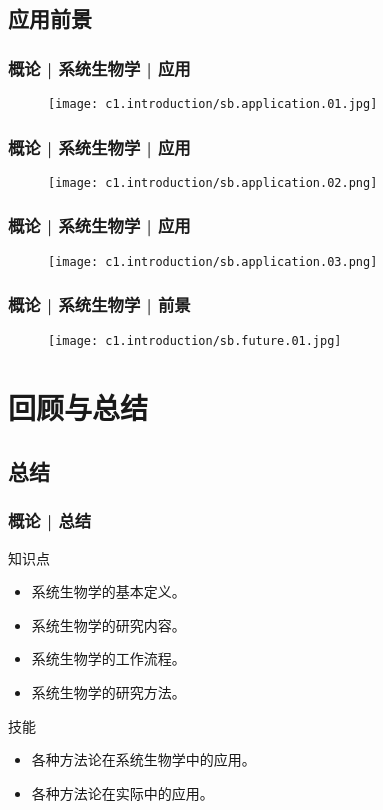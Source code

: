 \subsection{应用前景}
\begin{frame}
  \frametitle{概论 | 系统生物学 | 应用}
  \begin{figure}
    \centering
    \texttt{[image: c1.introduction/sb.application.01.jpg]}
  \end{figure}
\end{frame}

\begin{frame}
  \frametitle{概论 | 系统生物学 | 应用}
  \begin{figure}
    \centering
    \texttt{[image: c1.introduction/sb.application.02.png]}
  \end{figure}
\end{frame}

\begin{frame}
  \frametitle{概论 | 系统生物学 | 应用}
  \begin{figure}
    \centering
    \texttt{[image: c1.introduction/sb.application.03.png]}
  \end{figure}
\end{frame}

\begin{frame}
  \frametitle{概论 | 系统生物学 | 前景}
  \begin{figure}
    \centering
    \texttt{[image: c1.introduction/sb.future.01.jpg]}
  \end{figure}
\end{frame}



\section{回顾与总结}
\subsection{总结}
\begin{frame}
  \frametitle{概论 | 总结}
  \begin{block}{知识点}
    \begin{itemize}
      \item 系统生物学的基本定义。
      \item 系统生物学的研究内容。
      \item 系统生物学的工作流程。
      \item 系统生物学的研究方法。
    \end{itemize}
  \end{block}
  \begin{block}{技能}
    \begin{itemize}
      \item 各种方法论在系统生物学中的应用。
      \item 各种方法论在实际中的应用。
    \end{itemize}
  \end{block}
\end{frame}

